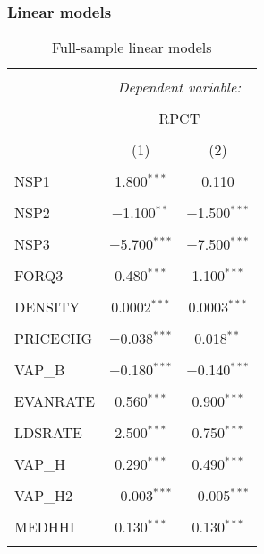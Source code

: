 \documentclass[
]{article}
\begin{document}
\hypertarget{linear-models}{%
\subsubsection{Linear models}\label{linear-models}}

\begin{table}[!htbp] \centering
  \caption{Full-sample linear models}
  \label{tab:fullsample}
\small
\begin{tabular}{@{\extracolsep{3pt}}lcc}
\\[-1.8ex]\hline
\hline \\[-1.8ex]
 & \multicolumn{2}{c}{\textit{Dependent variable:}} \\
\cline{2-3}
\\[-1.8ex] & \multicolumn{2}{c}{RPCT} \\
\\[-1.8ex] & (1) & (2)\\
\hline \\[-1.8ex]
 NSP1 & 1.800$^{***}$ & 0.110 \\
  & & \\
 NSP2 & $-$1.100$^{**}$ & $-$1.500$^{***}$ \\
  & & \\
 NSP3 & $-$5.700$^{***}$ & $-$7.500$^{***}$ \\
  & & \\
 FORQ3 & 0.480$^{***}$ & 1.100$^{***}$ \\
  & & \\
 DENSITY & 0.0002$^{***}$ & 0.0003$^{***}$ \\
  & & \\
 PRICECHG & $-$0.038$^{***}$ & 0.018$^{**}$ \\
  & & \\
 VAP\_B & $-$0.180$^{***}$ & $-$0.140$^{***}$ \\
  & & \\
 EVANRATE & 0.560$^{***}$ & 0.900$^{***}$ \\
  & & \\
 LDSRATE & 2.500$^{***}$ & 0.750$^{***}$ \\
  & & \\
 VAP\_H & 0.290$^{***}$ & 0.490$^{***}$ \\
  & & \\
 VAP\_H2 & $-$0.003$^{***}$ & $-$0.005$^{***}$ \\
  & & \\
 MEDHHI & 0.130$^{***}$ & 0.130$^{***}$ \\
  & & \\

\end{tabular}
\end{table}
\end{document}
